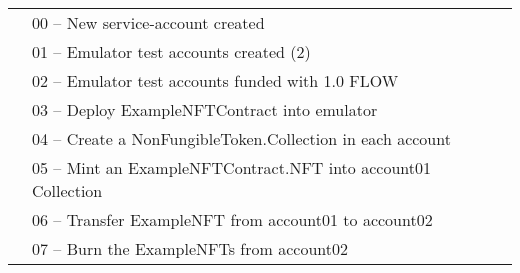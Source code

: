 \documentclass[../NFTComp_IEEE.tex]{subfiles}
\begin{document}
\begin{table}[ht]
{\begin{tabular}{lllllll}
            \multicolumn{1}{l|}{}                              & \multicolumn{6}{l|}{00 – New service-account created}                                                                                                                                                                                                                             \\ \cline{2-7}
            \multicolumn{1}{l|}{}                              & \multicolumn{6}{l|}{01 – Emulator test accounts created (2)}                                                                                                                                                                                                                      \\ \cline{2-7}
            \multicolumn{1}{l|}{}                              & \multicolumn{6}{l|}{02 – Emulator test accounts funded with 1.0 FLOW}                                                                                                                                                                                                             \\ \cline{2-7}
            \multicolumn{1}{l|}{}                              & \multicolumn{6}{l|}{03 – Deploy ExampleNFTContract into emulator}                                                                                                                                                                                                                 \\ \cline{2-7}
            \multicolumn{1}{l|}{}                              & \multicolumn{6}{l|}{04 – Create a NonFungibleToken.Collection in each account}                                                                                                                                                                                                    \\ \cline{2-7}
            \multicolumn{1}{l|}{}                              & \multicolumn{6}{l|}{05 – Mint an ExampleNFTContract.NFT into account01 Collection}                                                                                                                                                                                                \\ \cline{2-7}
            \multicolumn{1}{l|}{}                              & \multicolumn{6}{l|}{06 – Transfer ExampleNFT from account01 to account02}                                                                                                                                                                                                         \\ \cline{2-7}
            \multicolumn{1}{l|}{}                              & \multicolumn{6}{l|}{07 – Burn the ExampleNFTs from account02}                                                                                                                                                                                                                     \\ \cline{2-7}
        \end{tabular}%
    }
\end{table}
\end{document}
